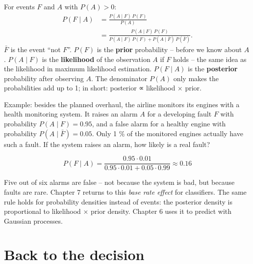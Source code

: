 \documentclass[
  letterpaper,
  DIV=11,
  numbers=noendperiod]{scrreprt}
\begin{document}
\begin{tcolorbox}[enhanced jigsaw, left=2mm, title=\textcolor{quarto-callout-important-color}{\faExclamation}\hspace{0.5em}{Theorem: Bayes' theorem}, opacityback=0, breakable, rightrule=.15mm, arc=.35mm, toptitle=1mm, colbacktitle=quarto-callout-important-color!10!white, opacitybacktitle=0.6, coltitle=black, colframe=quarto-callout-important-color-frame, bottomrule=.15mm, leftrule=.75mm, bottomtitle=1mm, titlerule=0mm, toprule=.15mm, colback=white]

For events \(F\) and \(A\) with \(P(A) > 0\):
\[\begin{aligned} P(F \mid A) &= \frac{P(A \mid F)\,P(F)}{P(A)} \\ &= \frac{P(A \mid F)\,P(F)}{P(A \mid F)\,P(F) + P(A \mid \bar F)\,P(\bar F)}. \end{aligned}\]
\(\bar F\) is the event ``not \(F\)''. \(P(F)\) is the \textbf{prior}
probability -- before we know about \(A\). \(P(A \mid F)\) is the
\textbf{likelihood} of the observation \(A\) if \(F\) holds -- the same
idea as the likelihood in maximum likelihood estimation. \(P(F \mid A)\)
is the \textbf{posterior} probability after observing \(A\). The
denominator \(P(A)\) only makes the probabilities add up to 1; in short:
posterior ∝ likelihood × prior.

\end{tcolorbox}

Example: besides the planned overhaul, the airline monitors its engines
with a health monitoring system. It raises an alarm \(A\) for a
developing fault \(F\) with probability \(P(A \mid F) = 0.95\), and a
false alarm for a healthy engine with probability
\(P(A \mid \bar F) = 0.05\). Only 1 \% of the monitored engines actually
have such a fault. If the system raises an alarm, how likely is a real
fault?

\[P(F \mid A) = \frac{0.95 \cdot 0.01}{0.95 \cdot 0.01 + 0.05 \cdot 0.99} \approx 0.16\]

Five out of six alarms are false -- not because the system is bad, but
because faults are rare. Chapter 7 returns to this \emph{base rate
effect} for classifiers. The same rule holds for probability densities
instead of events: the posterior density is proportional to likelihood ×
prior density. Chapter 6 uses it to predict with Gaussian processes.

\section{Back to the decision}\label{back-to-the-decision-2}
\end{document}
